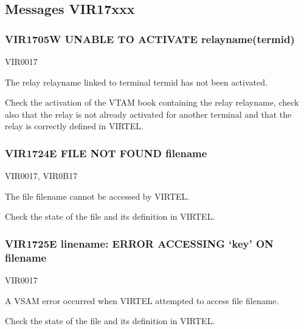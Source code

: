 \documentclass[letterpaper,10pt,english]{sphinxmanual}
\begin{document}
\subsection{Messages VIR17xxx}
\label{\detokenize{messages:messages-vir17xxx}}

\subsubsection{VIR1705W UNABLE TO ACTIVATE relayname(termid)}
\label{\detokenize{messages:vir1705w-unable-to-activate-relayname-termid}}\begin{description}
\sphinxAtStartPar
VIR0017

\sphinxAtStartPar
The relay relayname linked to terminal termid has not been activated.

\sphinxAtStartPar
Check the activation of the VTAM book containing the relay relayname, check also that the relay is not already activated for another terminal and that the relay is correctly defined in VIRTEL.

\end{description}


\subsubsection{VIR1724E FILE NOT FOUND filename}
\label{\detokenize{messages:vir1724e-file-not-found-filename}}\begin{description}
\sphinxAtStartPar
VIR0017, VIR0B17

\sphinxAtStartPar
The file filename cannot be accessed by VIRTEL.

\sphinxAtStartPar
Check the state of the file and its definition in VIRTEL.

\end{description}


\subsubsection{VIR1725E linename: ERROR ACCESSING ‘key’ ON filename}
\label{\detokenize{messages:vir1725e-linename-error-accessing-key-on-filename}}\begin{description}
\sphinxAtStartPar
VIR0017

\sphinxAtStartPar
A VSAM error occurred when VIRTEL attempted to access file filename.

\sphinxAtStartPar
Check the state of the file and its definition in VIRTEL.

\end{description}
\end{document}
